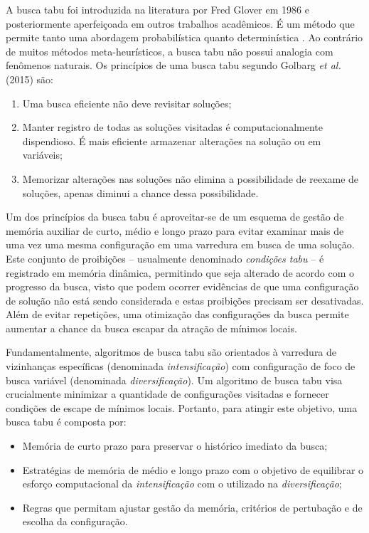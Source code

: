A busca tabu foi introduzida na literatura por Fred Glover em 1986 \cite{GLOVER1986533} e posteriormente aperfeiçoada em outros trabalhos acadêmicos. É um método que permite tanto uma abordagem probabilística \cite{crainic1993dynamic} quanto determinística \cite{ongsakul2004unit}. Ao contrário de muitos métodos meta-heurísticos, a busca tabu não possui analogia com fenômenos naturais. Os princípios de uma busca tabu segundo Golbarg \emph{et al.} (2015) são:
\begin{enumerate}
    \item Uma busca eficiente não deve revisitar soluções;
    \item Manter registro de todas as soluções visitadas é computacionalmente dispendioso. É mais eficiente armazenar alterações na solução ou em variáveis;
    \item Memorizar alterações nas soluções não elimina a possibilidade de reexame de soluções, apenas diminui a chance dessa possibilidade.
\end{enumerate}

Um dos princípios da busca tabu é aproveitar-se de um esquema de gestão de memória auxiliar de curto, médio e longo prazo para evitar examinar mais de uma vez uma mesma configuração em uma varredura em busca de uma solução. Este conjunto de proibições -- usualmente denominado \emph{condições tabu} -- é registrado em memória dinâmica, permitindo que seja alterado de acordo com o progresso da busca, visto que podem ocorrer evidências de que uma configuração de solução não está sendo considerada e estas proibições precisam ser desativadas. Além de evitar repetições, uma otimização das configurações da busca permite aumentar a chance da busca escapar da atração de mínimos locais. 

Fundamentalmente, algoritmos de busca tabu são orientados à varredura de vizinhanças específicas (denominada \emph{intensificação}) com configuração de foco de busca variável (denominada \emph{diversificação}). Um algoritmo de busca tabu visa crucialmente minimizar a quantidade de configurações visitadas e fornecer condições de escape de mínimos locais. Portanto, para atingir este objetivo, uma busca tabu é composta por:

\begin{itemize}
    \item Memória de curto prazo para preservar o histórico imediato da busca;
    \item Estratégias de memória de médio e longo prazo com o objetivo de equilibrar o esforço computacional da \emph{intensificação} com o utilizado na \emph{diversificação};
    \item Regras que permitam ajustar gestão da memória, critérios de pertubação e de escolha da configuração.
\end{itemize}

